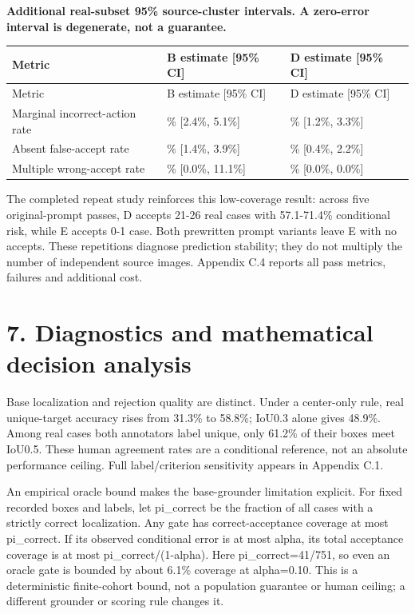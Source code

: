 \documentclass[10pt]{article}
\begin{document}
\begingroup\small
\textbf{Additional real-subset 95\% source-cluster intervals. A zero-error interval is degenerate, not a guarantee.}
\begin{longtable}{>{\raggedright\arraybackslash}p{}>{\raggedright\arraybackslash}p{}>{\raggedright\arraybackslash}p{}}
\toprule
\textbf{Metric} & \textbf{B estimate [95\% CI]} & \textbf{D estimate [95\% CI]}\\\midrule
\endfirsthead
\toprule
Metric & B estimate [95\% CI] & D estimate [95\% CI]\\\midrule
\endhead
Marginal incorrect-action rate & 3.7\% [2.4\%, 5.1\%] & 2.1\% [1.2\%, 3.3\%]\\
Absent false-accept rate & 2.6\% [1.4\%, 3.9\%] & 1.2\% [0.4\%, 2.2\%]\\
Multiple wrong-accept rate & 3.4\% [0.0\%, 11.1\%] & 0.0\% [0.0\%, 0.0\%]\\
\bottomrule\end{longtable}\endgroup
The completed repeat study reinforces this low-coverage result: across five original-prompt passes, D accepts 21-26 real cases with 57.1-71.4\% conditional risk, while E accepts 0-1 case. Both prewritten prompt variants leave E with no accepts. These repetitions diagnose prediction stability; they do not multiply the number of independent source images. Appendix C.4 reports all pass metrics, failures and additional cost.

\section*{7. Diagnostics and mathematical decision analysis}
Base localization and rejection quality are distinct. Under a center-only rule, real unique-target accuracy rises from 31.3\% to 58.8\%; IoU0.3 alone gives 48.9\%. Among real cases both annotators label unique, only 61.2\% of their boxes meet IoU0.5. These human agreement rates are a conditional reference, not an absolute performance ceiling. Full label/criterion sensitivity appears in Appendix C.1.

An empirical oracle bound makes the base-grounder limitation explicit. For fixed recorded boxes and labels, let pi\_correct be the fraction of all cases with a strictly correct localization. Any gate has correct-acceptance coverage at most pi\_correct. If its observed conditional error is at most alpha, its total acceptance coverage is at most pi\_correct/(1-alpha). Here pi\_correct=41/751, so even an oracle gate is bounded by about 6.1\% coverage at alpha=0.10. This is a deterministic finite-cohort bound, not a population guarantee or human ceiling; a different grounder or scoring rule changes it.
\end{document}
